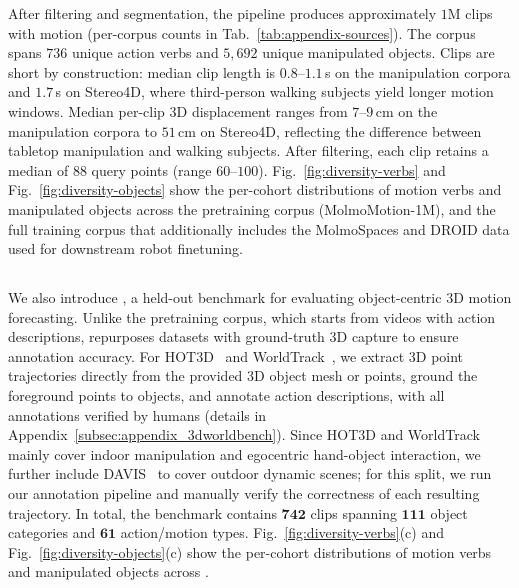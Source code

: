 After filtering and segmentation, the pipeline produces approximately $1$M clips with motion (per-corpus counts in Tab.~\ref{tab:appendix-sources}). The corpus spans $736$ unique action verbs and $5{,}692$ unique manipulated objects. Clips are short by construction: median clip length is $0.8$--$1.1$\,s on the manipulation corpora and $1.7$\,s on Stereo4D, where third-person walking subjects yield longer motion windows. Median per-clip 3D displacement ranges from $7$--$9$\,cm on the manipulation corpora to $51$\,cm on Stereo4D, reflecting the difference between tabletop manipulation and walking subjects. After filtering, each clip retains a median of $88$ query points (range $60$--$100$). Fig.~\ref{fig:diversity-verbs} and Fig.~\ref{fig:diversity-objects} show the per-cohort distributions of motion verbs and manipulated objects across the pretraining corpus (MolmoMotion-1M), and the full training corpus that additionally includes the MolmoSpaces and DROID data used for downstream robot finetuning.




\subsection{\benchmarkname{}}
\label{subsec:data_and_benchmark}
We also introduce \textbf{\benchmarkname{}}, a held-out benchmark for evaluating object-centric 3D motion forecasting. Unlike the pretraining corpus, which starts from videos with action descriptions, \benchmarkname{} repurposes datasets with ground-truth 3D capture to ensure annotation accuracy. For HOT3D~\cite{hot3d} and WorldTrack~\cite{feng2025st4rtrack}, we extract 3D point trajectories directly from the provided 3D object mesh or points, ground the foreground points to objects, and annotate action descriptions, with all annotations verified by humans (details in Appendix~\ref{subsec:appendix_3dworldbench}). Since HOT3D and WorldTrack mainly cover indoor manipulation and egocentric hand-object interaction, we further include DAVIS~\cite{davis} to cover outdoor dynamic scenes; for this split, we run our annotation pipeline and manually verify the correctness of each resulting trajectory.
In total, the benchmark contains $\mathbf{742}$ clips spanning $\mathbf{111}$ object categories and $\mathbf{61}$ action/motion types. Fig.~\ref{fig:diversity-verbs}(c) and Fig.~\ref{fig:diversity-objects}(c) show the per-cohort distributions of motion verbs and manipulated objects across \benchmarkname{}.

